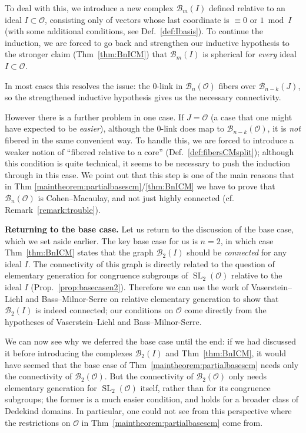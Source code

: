 \documentclass[11 pt]{article}
\theoremstyle{plain}
\theoremstyle{definition}
\numberwithin{equation}{section}
\DeclareMathOperator{\SL}{SL}
\newcommand{\para}[1]{\bigskip\noindent\textbf{#1.}}
\renewcommand{\O}{\mathcal{O}}
\newcommand\PartialBases{\ensuremath{\mathcal{B}}}
\newcommand{\PB}{\PartialBases}
\begin{document}
To deal with this, we introduce a new complex $\PB_m(I)$ defined relative to an ideal $I\subset \O$, consisting only of vectors whose last coordinate is $\equiv 0$ or $1\bmod{I}$ (with some additional conditions, see Def.~\ref{def:Ibasis}).
To continue the induction, we are forced to go back and strengthen our inductive hypothesis to the stronger claim (Thm~\ref{thm:BnICM}) that $\PB_m(I)$ is spherical for \emph{every} ideal $I\subset \O$.

In most cases this resolves the issue: the 0-link in $\PB_n(\O)$ fibers over $\PB_{n-k}(J)$, so the strengthened inductive hypothesis gives us the necessary connectivity.


However there is a further problem in one case. If $J=\O$ (a case that one might have expected to be \emph{easier}), although the 0-link does map to $\PB_{n-k}(\O)$, it is \emph{not} fibered in the same convenient way. To handle this, we are forced to introduce a weaker notion of ``fibered relative to a core'' (Def.~\ref{def:fibersCMsplit}); although this  condition is quite technical, it seems to be necessary to push the induction through in this case. We point out that this step is one of the main reasons that in Thm \ref{maintheorem:partialbasescm}/\ref{thm:BnICM} we have to prove that $\PB_n(\O)$ is Cohen--Macaulay, and not just highly connected (cf. Remark~\ref{remark:trouble}).

\para{Returning to the base case} Let us return to the discussion of the base case, which we set aside earlier. The key base case for us is  $n=2$, in which case Thm~\ref{thm:BnICM} states that the graph $\PB_2(I)$ should be \emph{connected} for any ideal $I$. The connectivity of this graph is directly related to the question of elementary generation for congruence subgroups of $\SL_2(\O)$ relative to the ideal $I$ (Prop.~\ref{prop:basecasen2}). Therefore we can use the work of Vaserstein--Liehl and Bass--Milnor-Serre on relative elementary generation to show that $\PB_2(I)$ is indeed connected; our conditions on $\O$ come directly from the hypotheses of Vaserstein--Liehl and Bass--Milnor-Serre.

We can now see why we deferred the base case until the end: if we had discussed it before introducing the complexes $\PB_2(I)$ and Thm~\ref{thm:BnICM}, it would have seemed that  the base case of Thm~\ref{maintheorem:partialbasescm} needs only the connectivity of $\PB_2(\O)$. But the connectivity of $\PB_2(\O)$ only needs  elementary generation for $\SL_2(\O)$ itself, rather than for its congruence subgroups; the former is a much easier condition, and holds for a broader class of Dedekind domains. In particular, one could not see from this perspective where the restrictions on $\O$ in Thm~\ref{maintheorem:partialbasescm}  come from.
\end{document}

